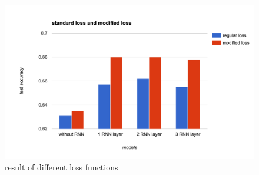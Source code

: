\begin{figure}[H] 
	\centering
	\includegraphics[width=6in]{Figures/exp_loss}
	\caption[result of different loss functions]{result of different loss functions}
	\label{fig:exp_loss}
\end{figure}

